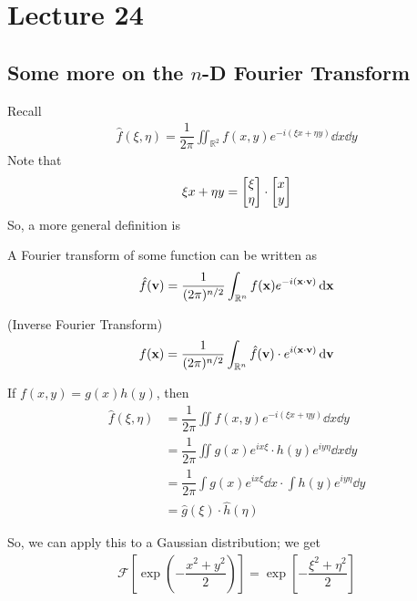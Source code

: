\section{Lecture 24}
\subsection{Some more on the $n$-D Fourier Transform}
Recall
\begin{align}
    \widehat{f}(\xi, \eta) = \dfrac{1}{2\pi} \iint_{\mathbb{R}^2} f(x, y) e^{-i(\xi x + \eta y)} \dd{x}\dd{y}
\end{align}
Note that
\begin{align}
    \xi x + \eta y = \mqty[\xi\\\eta] \cdot \mqty[x\\y]
\end{align}
So, a more general definition is
\begin{definition}
    A Fourier transform of some function can be written as
    \begin{align}
        \hat{f}(\vb{v}) = \dfrac{1}{(2\pi)^{n/2}} \int_{\mathbb{R}^n} f(\vb{x}) e^{-i(\vb{x} \cdot \vb{v})} \dd{\vb{x}}
    \end{align}
\end{definition}

\begin{definition}
    (Inverse Fourier Transform)
    \begin{align}
        f(\vb{x}) = \dfrac{1}{(2\pi)^{n/2}} \int_{\mathbb{R}^n} \hat{f}(\vb{v}) \cdot e^{i(\vb{x} \cdot \vb{v})} \dd{\vb{v}}
    \end{align}
\end{definition}
\begin{proposition}
    If $f(x,y) = g(x)h(y)$, then
    \begin{align}
        \hat{f}(\xi, \eta) &= \dfrac{1}{2\pi} \iint f(x,y) e^{-i(\xi x + \eta y)} \dd{x}\dd{y}\\
        &= \dfrac{1}{2\pi} \iint g(x)e^{ix\xi} \cdot h(y) e^{iy\eta} \dd{x}\dd{y}\\
        &= \dfrac{1}{2\pi} \int g(x)e^{ix\xi} \dd{x} \cdot \int h(y) e^{iy\eta} \dd{y}\\
        &= \hat{g}(\xi) \cdot \hat{h}(\eta)
    \end{align}
\end{proposition}
So, we can apply this to a Gaussian distribution; we get
\begin{align}
    \mathcal{F}\left[ \exp(-\dfrac{x^2+y^2}{2}) \right] = \exp[-\dfrac{\xi^2+\eta^2}{2}]
\end{align}

